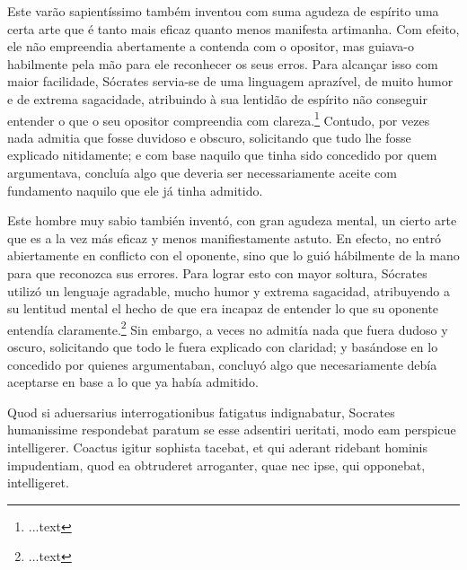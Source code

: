 \documentclass{article}
\begin{document}
\begin{paracol}{3}
\begin{nthcolumn*}{0}
  \end{nthcolumn*}
  \vspace{0.5cm}
  \begin{nthcolumn}{1} %
    Este varão sapientíssimo também inventou com suma agudeza de espírito uma
    certa arte que é tanto mais eficaz quanto menos manifesta artimanha. Com efeito, ele não empreendia abertamente a contenda com o opositor, mas guiava-o habilmente pela mão para ele reconhecer os seus erros. Para alcançar isso com maior facilidade, Sócrates servia-se de uma linguagem aprazível, de muito humor e de extrema sagacidade, atribuindo à sua lentidão de espírito não conseguir entender o que o seu opositor compreendia com clareza.\footnote[18]{...text} Contudo, por vezes nada admitia que fosse duvidoso e obscuro, solicitando que tudo lhe fosse explicado nitidamente; e com base naquilo que tinha sido concedido por quem argumentava, concluía algo que deveria ser necessariamente aceite com fundamento naquilo que ele já tinha admitido.
  \end{nthcolumn}
  \vspace{0.5cm}
  \begin{nthcolumn}{2} %
    Este hombre muy sabio también inventó, con gran agudeza mental, un
    cierto arte que es a la vez más eficaz y menos manifiestamente astuto.   En efecto, no entró abiertamente en conflicto con el oponente, sino que lo guió hábilmente de la mano para que reconozca sus errores. Para lograr esto con mayor soltura, Sócrates utilizó un lenguaje agradable, mucho humor y extrema sagacidad, atribuyendo a su lentitud mental el hecho de que era incapaz de entender lo que su oponente entendía claramente.\footnote[18]{...text} Sin embargo, a veces no admitía nada que fuera dudoso y oscuro, solicitando que todo le fuera explicado con claridad; y basándose en lo concedido por quienes argumentaban, concluyó algo que necesariamente debía aceptarse en base a lo que ya había admitido.
  \end{nthcolumn}
  \vspace{0.5cm}
  \begin{nthcolumn*}{0} %
    Quod si aduersarius interrogationibus fatigatus indignabatur, Socrates humanissime respondebat paratum se esse adsentiri ueritati, modo eam perspicue intelligerer. Coactus igitur sophista tacebat, et qui aderant ridebant hominis impudentiam, quod ea obtruderet arroganter, quae nec ipse, qui opponebat, intelligeret.
  \end{nthcolumn*}
  \vspace{0.5cm}

\end{paracol}
\end{document}
